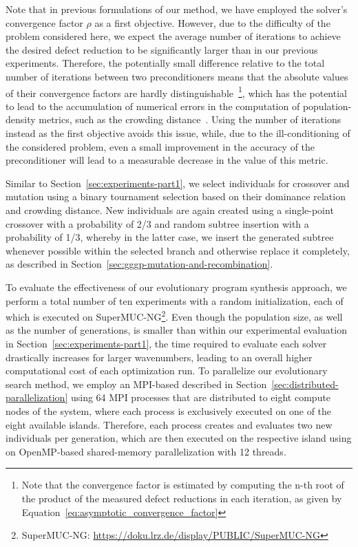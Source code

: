 Note that in previous formulations of our method, we have employed the solver's convergence factor $\rho$ as a first objective.
However, due to the difficulty of the problem considered here, we expect the average number of iterations to achieve the desired defect reduction to be significantly larger than in our previous experiments. 
Therefore, the potentially small difference relative to the total number of iterations between two preconditioners means that the absolute values of their convergence factors are hardly distinguishable~\footnote{Note that the convergence factor is estimated by computing the n-th root of the product of the measured defect reductions in each iteration, as given by Equation~\eqref{eq:asymptotic_convergence_factor}}, which has the potential to lead to the accumulation of numerical errors in the computation of population-density metrics, such as the crowding distance~\cite{deb2002fast}.
Using the number of iterations instead as the first objective avoids this issue, while, due to the ill-conditioning of the considered problem, even a small improvement in the accuracy of the preconditioner will lead to a measurable decrease in the value of this metric.

Similar to Section~\ref{sec:experiments-part1}, we select individuals for crossover and mutation using a binary tournament selection based on their dominance relation and crowding distance.
New individuals are again created using a single-point crossover with a probability of 2/3 and random subtree insertion with a probability of 1/3, whereby in the latter case, we insert the generated subtree whenever possible within the selected branch and otherwise replace it completely, as described in Section~\ref{sec:gggp-mutation-and-recombination}.

To evaluate the effectiveness of our evolutionary program synthesis approach, we perform a total number of ten experiments with a random initialization, each of which is executed on SuperMUC-NG\footnote{SuperMUC-NG: \url{https://doku.lrz.de/display/PUBLIC/SuperMUC-NG}}.
Even though the population size, as well as the number of generations, is smaller than within our experimental evaluation in Section~\ref{sec:experiments-part1}, the time required to evaluate each solver drastically increases for larger wavenumbers, leading to an overall higher computational cost of each optimization run.
To parallelize our evolutionary search method, we employ an MPI-based described in Section~\ref{sec:distributed-parallelization} using 64 MPI processes that are distributed to eight compute nodes of the system, where each process is exclusively executed on one of the eight available islands.
Therefore, each process creates and evaluates two new individuals per generation, which are then executed on the respective island using on OpenMP-based shared-memory parallelization with 12 threads.

